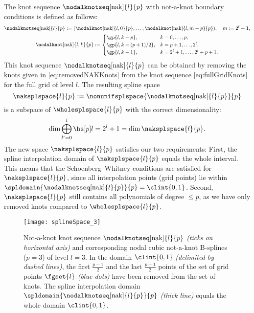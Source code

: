 The knot sequence $\nodalknotseq[\nak]{l}{p}$
with not-a-knot boundary conditions is defined as follows:
\begin{subequations}
  \begin{gather}
    \nodalknotseq[\nak]{l}{p}
    := (\nodalknot[\nak]{l,0}{p}, \dotsc,
    \nodalknot[\nak]{l,m+p}{p}),\quad
    m := 2^l + 1,\\
    \nodalknot[\nak]{l,k}{p}
    :=
    \begin{cases}
      \gp{l,k-p},&
      k = 0, \dotsc, p,\\
      \gp{l,k-(p+1)/2},&
      k = p + 1, \dotsc, 2^l,\\
      \gp{l,k-1},&
      k = 2^l + 1, \dotsc, 2^l + p + 1.
    \end{cases}
  \end{gather}
\end{subequations}
This knot sequence $\nodalknotseq[\nak]{l}{p}$
can be obtained by removing the knots
given in \eqref{eq:removedNAKKnots} from the
knot sequence \eqref{eq:fullGridKnots} for the full grid of level $l$.
The resulting spline space
\begin{equation}
  \naksplspace{l}{p}
  := \nonunifsplspace{\nodalknotseq[\nak]{l}{p}}{p}
\end{equation}
is a subspace
of $\wholesplspace{l}{p}$ with the correct dimensionality:
\begin{equation}
  \dim \bigoplus_{l'=0}^l \hsbspl{l}{p}
  = 2^l + 1
  = \dim \naksplspace{l}{p}.
\end{equation}
The new space $\naksplspace{l}{p}$ satisfies our two requirements:
First, the spline interpolation domain of $\naksplspace{l}{p}$
equals the whole interval.
This means that the Schoenberg--Whitney conditions are satisfied
for $\naksplspace{l}{p}$, since all interpolation points
(grid points) lie within
$\spldomain{\nodalknotseq[\nak]{l}{p}}{p} = \clint{0, 1}$.
Second, $\naksplspace{l}{p}$ still contains all polynomials of
degree $\le p$, as we have only removed knots compared to
$\wholesplspace{l}{p}$.

\begin{figure}
  \texttt{[image: splineSpace\_3]}%
  \caption[%
    Nodal not-a-knot B-splines and knot sequence%
  ]{%
    Not-a-knot knot sequence $\nodalknotseq[\nak]{l}{p}$
    \emph{(ticks on horizontal axis)}
    and corresponding nodal cubic not-a-knot B-splines ($p = 3$)
    of level $l = 3$.
    In the domain $\clint{0, 1}$ \emph{(delimited by dashed lines)},
    the first $\tfrac{p-1}{2}$ and the last $\tfrac{p-1}{2}$ points
    of the set of grid points $\fgset{l}$
    \emph{\textcolor{mittelblau}{(blue dots)}}
    have been removed from the set of knots.
    The spline interpolation domain
    $\spldomain{\nodalknotseq[\nak]{l}{p}}{p}$
    \emph{(thick line)}
    equals the whole domain $\clint{0, 1}$.%
  }%
  \label{fig:splineSpaceNotAKnot}%
\end{figure}

